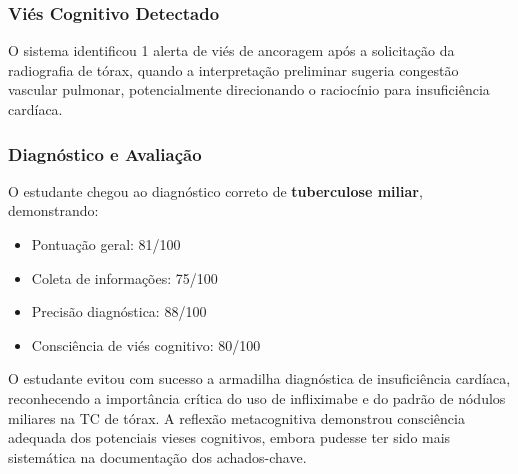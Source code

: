 \subsubsection*{Viés Cognitivo Detectado}

O sistema identificou 1 alerta de viés de ancoragem após a solicitação da radiografia de tórax, quando a interpretação preliminar sugeria congestão vascular pulmonar, potencialmente direcionando o raciocínio para insuficiência cardíaca.

\subsubsection*{Diagnóstico e Avaliação}

O estudante chegou ao diagnóstico correto de \textbf{tuberculose miliar}, demonstrando:
\begin{itemize}
    \item Pontuação geral: 81/100
    \item Coleta de informações: 75/100
    \item Precisão diagnóstica: 88/100
    \item Consciência de viés cognitivo: 80/100
\end{itemize}

O estudante evitou com sucesso a armadilha diagnóstica de insuficiência cardíaca, reconhecendo a importância crítica do uso de infliximabe e do padrão de nódulos miliares na TC de tórax. A reflexão metacognitiva demonstrou consciência adequada dos potenciais vieses cognitivos, embora pudesse ter sido mais sistemática na documentação dos achados-chave.

